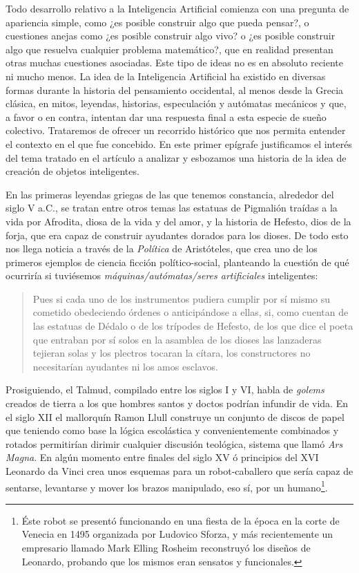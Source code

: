 \documentclass[12pt]{memoir}
\begin{document}
Todo desarrollo relativo a la Inteligencia Artificial comienza con una pregunta de apariencia simple, como ¿es posible construir algo que pueda pensar?, o cuestiones anejas como  ¿es posible construir algo vivo? o ¿es posible construir algo que resuelva cualquier problema matemático?, que en realidad presentan otras muchas cuestiones asociadas. Este tipo de ideas no es en absoluto reciente ni mucho menos. La idea de la Inteligencia Artificial ha existido en diversas formas durante la historia del pensamiento occidental, al menos desde la Grecia clásica, en mitos, leyendas, historias, especulación y autómatas mecánicos y que, a favor o en contra, intentan dar una respuesta final a esta especie de sueño colectivo. Trataremos de ofrecer un recorrido histórico que nos permita entender el contexto en el que \parencite{Turing1950cmi} fue concebido. En este primer epígrafe justificamos el interés del tema tratado en el artículo a analizar y esbozamos una historia de la idea de creación de objetos inteligentes.

En las primeras leyendas griegas de las que tenemos constancia, alrededor del siglo V a.C., se tratan entre otros temas las estatuas de Pigmalión traídas a la vida por Afrodita, diosa de la vida y del amor, y la historia de Hefesto, dios de la forja, que era capaz de construir ayudantes dorados para los dioses. De todo esto nos llega noticia a través de la \textit{Política} de Aristóteles, que crea uno de los primeros ejemplos de ciencia ficción político-social, planteando la cuestión de qué ocurriría si tuviésemos \textit{máquinas/autómatas/seres artificiales} inteligentes:

\begin{quotation}
Pues si cada uno de los instrumentos pudiera cumplir por sí mismo su cometido obedeciendo órdenes o anticipándose a ellas, si, como cuentan de las estatuas de Dédalo o de los trípodes de Hefesto, de los que dice el poeta que entraban por sí solos en la asamblea de los dioses las lanzaderas tejieran solas y los plectros tocaran la cítara, los constructores no necesitarían ayudantes ni los amos esclavos. \parencite[Aristot. Pol. 1.1253b]{aristotlePolitics}
\end{quotation}

Prosiguiendo, el Talmud, compilado entre los siglos I y VI, habla de \textit{golems} creados de tierra a los que hombres santos y doctos podrían infundir de vida. En el siglo XII el mallorquín Ramon Llull construye un conjunto de discos de papel que teniendo como base la lógica escolástica y convenientemente combinados y rotados permitirían dirimir cualquier discusión teológica, sistema que llamó \textit{Ars Magna}. En algún momento entre finales del siglo XV ó principios del XVI Leonardo da Vinci crea unos esquemas para un robot-caballero que sería capaz de sentarse, levantarse y mover los brazos manipulado, eso sí, por un humano\footnote{Éste robot se presentó funcionando en una fiesta de la época en la corte de Venecia en 1495 organizada por Ludovico Sforza, y más recientemente un empresario llamado Mark Elling Rosheim reconstruyó los diseños de Leonardo, probando que los mismos eran sensatos y funcionales.}. 
\end{document}
